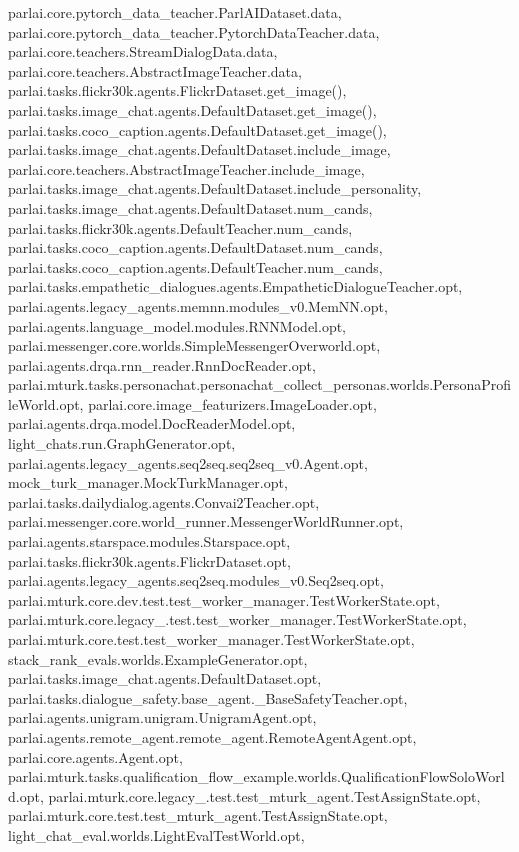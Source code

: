 parlai.\+core.\+pytorch\+\_\+data\+\_\+teacher.\+Parl\+A\+I\+Dataset.\+data, parlai.\+core.\+pytorch\+\_\+data\+\_\+teacher.\+Pytorch\+Data\+Teacher.\+data, parlai.\+core.\+teachers.\+Stream\+Dialog\+Data.\+data, parlai.\+core.\+teachers.\+Abstract\+Image\+Teacher.\+data, parlai.\+tasks.\+flickr30k.\+agents.\+Flickr\+Dataset.\+get\+\_\+image(), parlai.\+tasks.\+image\+\_\+chat.\+agents.\+Default\+Dataset.\+get\+\_\+image(), parlai.\+tasks.\+coco\+\_\+caption.\+agents.\+Default\+Dataset.\+get\+\_\+image(), parlai.\+tasks.\+image\+\_\+chat.\+agents.\+Default\+Dataset.\+include\+\_\+image, parlai.\+core.\+teachers.\+Abstract\+Image\+Teacher.\+include\+\_\+image, parlai.\+tasks.\+image\+\_\+chat.\+agents.\+Default\+Dataset.\+include\+\_\+personality, parlai.\+tasks.\+image\+\_\+chat.\+agents.\+Default\+Dataset.\+num\+\_\+cands, parlai.\+tasks.\+flickr30k.\+agents.\+Default\+Teacher.\+num\+\_\+cands, parlai.\+tasks.\+coco\+\_\+caption.\+agents.\+Default\+Dataset.\+num\+\_\+cands, parlai.\+tasks.\+coco\+\_\+caption.\+agents.\+Default\+Teacher.\+num\+\_\+cands, parlai.\+tasks.\+empathetic\+\_\+dialogues.\+agents.\+Empathetic\+Dialogue\+Teacher.\+opt, parlai.\+agents.\+legacy\+\_\+agents.\+memnn.\+modules\+\_\+v0.\+Mem\+N\+N.\+opt, parlai.\+agents.\+language\+\_\+model.\+modules.\+R\+N\+N\+Model.\+opt, parlai.\+messenger.\+core.\+worlds.\+Simple\+Messenger\+Overworld.\+opt, parlai.\+agents.\+drqa.\+rnn\+\_\+reader.\+Rnn\+Doc\+Reader.\+opt, parlai.\+mturk.\+tasks.\+personachat.\+personachat\+\_\+collect\+\_\+personas.\+worlds.\+Persona\+Profile\+World.\+opt, parlai.\+core.\+image\+\_\+featurizers.\+Image\+Loader.\+opt, parlai.\+agents.\+drqa.\+model.\+Doc\+Reader\+Model.\+opt, light\+\_\+chats.\+run.\+Graph\+Generator.\+opt, parlai.\+agents.\+legacy\+\_\+agents.\+seq2seq.\+seq2seq\+\_\+v0.\+Agent.\+opt, mock\+\_\+turk\+\_\+manager.\+Mock\+Turk\+Manager.\+opt, parlai.\+tasks.\+dailydialog.\+agents.\+Convai2\+Teacher.\+opt, parlai.\+messenger.\+core.\+world\+\_\+runner.\+Messenger\+World\+Runner.\+opt, parlai.\+agents.\+starspace.\+modules.\+Starspace.\+opt, parlai.\+tasks.\+flickr30k.\+agents.\+Flickr\+Dataset.\+opt, parlai.\+agents.\+legacy\+\_\+agents.\+seq2seq.\+modules\+\_\+v0.\+Seq2seq.\+opt, parlai.\+mturk.\+core.\+dev.\+test.\+test\+\_\+worker\+\_\+manager.\+Test\+Worker\+State.\+opt, parlai.\+mturk.\+core.\+legacy\+\_.\+test.\+test\+\_\+worker\+\_\+manager.\+Test\+Worker\+State.\+opt, parlai.\+mturk.\+core.\+test.\+test\+\_\+worker\+\_\+manager.\+Test\+Worker\+State.\+opt, stack\+\_\+rank\+\_\+evals.\+worlds.\+Example\+Generator.\+opt, parlai.\+tasks.\+image\+\_\+chat.\+agents.\+Default\+Dataset.\+opt, parlai.\+tasks.\+dialogue\+\_\+safety.\+base\+\_\+agent.\+\_\+\+Base\+Safety\+Teacher.\+opt, parlai.\+agents.\+unigram.\+unigram.\+Unigram\+Agent.\+opt, parlai.\+agents.\+remote\+\_\+agent.\+remote\+\_\+agent.\+Remote\+Agent\+Agent.\+opt, parlai.\+core.\+agents.\+Agent.\+opt, parlai.\+mturk.\+tasks.\+qualification\+\_\+flow\+\_\+example.\+worlds.\+Qualification\+Flow\+Solo\+World.\+opt, parlai.\+mturk.\+core.\+legacy\+\_.\+test.\+test\+\_\+mturk\+\_\+agent.\+Test\+Assign\+State.\+opt, parlai.\+mturk.\+core.\+test.\+test\+\_\+mturk\+\_\+agent.\+Test\+Assign\+State.\+opt, light\+\_\+chat\+\_\+eval.\+worlds.\+Light\+Eval\+Test\+World.\+opt, 